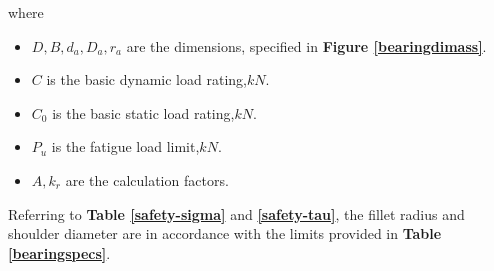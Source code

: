 where
\begin{itemize}
	\item $ D, B, d_a, D_a, r_a $ are the dimensions, specified in \textbf{Figure \ref{bearingdimass}}.
	\item $ C $ is the basic dynamic load rating,$ \unit{kN} $.
	\item $ C_0 $ is the basic static load rating,$ \unit{kN} $.
	\item $ P_u $ is the fatigue load limit,$ \unit{kN} $.
	\item $ A, k_r $ are the calculation factors.
\end{itemize}

Referring to \textbf{Table \ref{safety-sigma}} and \textbf{\ref{safety-tau}}, the fillet radius and shoulder diameter are in accordance with the limits provided in \textbf{Table \ref{bearingspecs}}.

